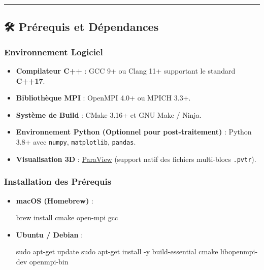 \documentclass[
  french,
]{article}
\newenvironment{Shaded}{}{}
\newcommand{\AttributeTok}[1]{\textcolor[rgb]{0.49,0.56,0.16}{#1}}
\newcommand{\ExtensionTok}[1]{#1}
\newcommand{\FunctionTok}[1]{\textcolor[rgb]{0.02,0.16,0.49}{#1}}
\newcommand{\NormalTok}[1]{#1}
\providecommand{\tightlist}{%
  \setlength{\itemsep}{0pt}\setlength{\parskip}{0pt}}
\begin{document}
\begin{center}\rule{0.5\linewidth}{0.5pt}\end{center}

\subsection{🛠 Prérequis et
Dépendances}\label{pruxe9requis-et-duxe9pendances}

\subsubsection{Environnement Logiciel}\label{environnement-logiciel}

\begin{itemize}
\tightlist
\item
  \textbf{Compilateur C++} : GCC 9+ ou Clang 11+ supportant le standard
  \textbf{C++17}.
\item
  \textbf{Bibliothèque MPI} : OpenMPI 4.0+ ou MPICH 3.3+.
\item
  \textbf{Système de Build} : CMake 3.16+ et GNU Make / Ninja.
\item
  \textbf{Environnement Python (Optionnel pour post-traitement)} :
  Python 3.8+ avec \texttt{numpy}, \texttt{matplotlib}, \texttt{pandas}.
\item
  \textbf{Visualisation 3D} : \href{https://www.paraview.org/}{ParaView}
  (support natif des fichiers multi-blocs \texttt{.pvtr}).
\end{itemize}

\subsubsection{Installation des
Prérequis}\label{installation-des-pruxe9requis}

\begin{itemize}
\item
  \textbf{macOS (Homebrew)} :

\begin{Shaded}
\begin{Highlighting}[]
\ExtensionTok{brew}\NormalTok{ install cmake open{-}mpi gcc}
\end{Highlighting}
\end{Shaded}
\item
  \textbf{Ubuntu / Debian} :

\begin{Shaded}
\begin{Highlighting}[]
\FunctionTok{sudo}\NormalTok{ apt{-}get update}
\FunctionTok{sudo}\NormalTok{ apt{-}get install }\AttributeTok{{-}y}\NormalTok{ build{-}essential cmake libopenmpi{-}dev openmpi{-}bin}
\end{Highlighting}
\end{Shaded}
\end{itemize}
\end{document}
